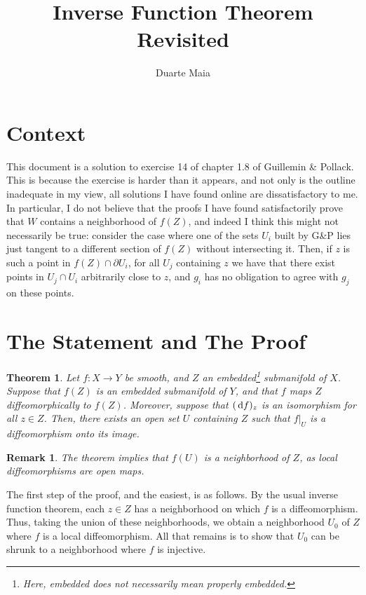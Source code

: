 \documentclass{article}
\title{Inverse Function Theorem Revisited}
\author{Duarte Maia}
\newtheorem{theorem}{Theorem}
\newtheorem{remark}{Remark}
\theoremstyle{definition}
\begin{document}
\maketitle

\section{Context}\label{sec:context}

This document is a solution to exercise 14 of chapter 1.8 of Guillemin \& Pollack. This is because the exercise is harder than it appears, and not only is the outline inadequate in my view, all solutions I have found online are dissatisfactory to me. In particular, I do not believe that the proofs I have found satisfactorily prove that $W$ contains a neighborhood of $f(Z)$, and indeed I think this might not necessarily be true: consider the case where one of the sets $U_i$ built by G\&P lies just tangent to a different section of $f(Z)$ without intersecting it. Then, if $z$ is such a point in $f(Z) \cap \partial U_i$, for all $U_j$ containing $z$ we have that there exist points in $U_j \cap U_i$ arbitrarily close to $z$, and $g_i$ has no obligation to agree with $g_j$ on these points.

\section{The Statement and The Proof}

\begin{theorem}
Let $f \colon X \to Y$ be smooth, and $Z$ an embedded\footnote{Here, embedded does not necessarily mean properly embedded.} submanifold of $X$. Suppose that $f(Z)$ is an embedded submanifold of $Y$, and that $f$ maps $Z$ diffeomorphically to $f(Z)$. Moreover, suppose that $(\dl f)_z$ is an isomorphism for all $z \in Z$. Then, there exists an open set $U$ containing $Z$ such that $f|_U$ is a diffeomorphism onto its image.
\end{theorem}

\begin{remark}
The theorem implies that $f(U)$ is a neighborhood of $Z$, as local diffeomorphisms are open maps.
\end{remark}

The first step of the proof, and the easiest, is as follows. By the usual inverse function theorem, each $z \in Z$ has a neighborhood on which $f$ is a diffeomorphism. Thus, taking the union of these neighborhoods, we obtain a neighborhood $U_0$ of $Z$ where $f$ is a local diffeomorphism. All that remains is to show that $U_0$ can be shrunk to a neighborhood where $f$ is injective.
\end{document}
